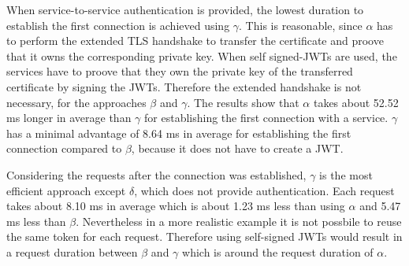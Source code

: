 When service-to-service authentication is provided, the lowest duration to establish the first connection is achieved using $\gamma$.
This is reasonable, since $\alpha$ has to perform the extended TLS handshake to transfer the certificate and proove that it owns the corresponding private key.
When self signed-JWTs are used, the services have to proove that they own the private key of the transferred certificate by signing the JWTs.
Therefore the extended handshake is not necessary, for the approaches $\beta$ and $\gamma$.
The results show that $\alpha$ takes about 52.52 ms longer in average than $\gamma$ for establishing the first connection with a service.
$\gamma$ has a minimal advantage of 8.64 ms in average for establishing the first connection compared to $\beta$, because it does not have to create a JWT.


Considering the requests after the connection was established, $\gamma$ is the most efficient approach except $\delta$, which does not provide authentication.
Each request takes about 8.10 ms in average which is about 1.23 ms less than using $\alpha$ and 5.47 ms less than $\beta$.
Nevertheless in a more realistic example it is not possbile to reuse the same token for each request.
Therefore using self-signed JWTs would result in a request duration between $\beta$ and $\gamma$ which is around the request duration of $\alpha$.

